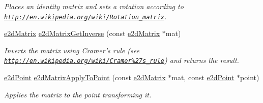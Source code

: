 \begin{DoxyCompactItemize}
\begin{DoxyCompactList}\small\item\em Places an identity matrix and sets a rotation according to \href{http://en.wikipedia.org/wiki/Rotation_matrix}{\tt http\-://en.\-wikipedia.\-org/wiki/\-Rotation\-\_\-matrix}. \end{DoxyCompactList}\item 
\hyperlink{structe2dMatrix}{e2d\-Matrix} \hyperlink{group__Ez2DS_ga86a7cb5c0d6fce078ed754195e8fe1e4}{e2d\-Matrix\-Get\-Inverse} (const \hyperlink{structe2dMatrix}{e2d\-Matrix} $\ast$mat)
\begin{DoxyCompactList}\small\item\em Inverts the matrix using Cramer's rule (see \href{http://en.wikipedia.org/wiki/Cramer%27s_rule}{\tt http\-://en.\-wikipedia.\-org/wiki/\-Cramer\%27s\-\_\-rule}) and returns the result. \end{DoxyCompactList}\item 
\hyperlink{structe2dPoint}{e2d\-Point} \hyperlink{group__Ez2DS_ga377eea18be8a4e88dcba9c62bffea97e}{e2d\-Matrix\-Apply\-To\-Point} (const \hyperlink{structe2dMatrix}{e2d\-Matrix} $\ast$mat, const \hyperlink{structe2dPoint}{e2d\-Point} $\ast$point)
\begin{DoxyCompactList}\small\item\em Applies the matrix to the point transforming it. \end{DoxyCompactList}\end{DoxyCompactItemize}
